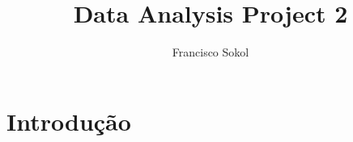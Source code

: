 \documentclass{article}
\begin{document}
\title{Data Analysis Project 2}
\author{Francisco Sokol}
\maketitle

\section{Introdução}

    
\end{document}
